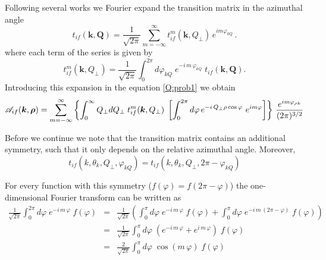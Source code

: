 Following several works \autocite{Rodrigu1996JPBp275,Galassi2002JPBp1727} we Fourier expand the transition matrix in the azimuthal angle
\[
t_{if}(\bm{k},\bm{Q}) = \frac{1}{\sqrt{2 \pi}} \sum_{m=-\infty}^{\infty} t^{m}_{if}(\bm{k},Q_{\perp}) \, e^{i m \varphi_{k Q}} \, .
\]
where each term of the series is given by
\[
t^{m}_{if}(\bm{k},Q_{\perp}) = \frac{1}{\sqrt{2 \pi}} \int_{0}^{2 \pi}
d \varphi_{k Q}\; e^{- i \,m\, \varphi_{k Q} } \;
t_{if}(\bm{k},\bm{Q}) .
\]
Introducing this expansion in the equation \ref{Q:prob1} we obtain
\[
\mathcal{A}_{if}(\bm{k},\boldsymbol{\rho}) = \sum_{m=-\infty}^{\infty} \left\{
\int_{0}^{\infty} Q_{\perp} d Q_{\perp} \;
t^{m}_{if}(\bm{k},Q_{\perp}) \; \left[ \int_{0}^{2 \pi} d \varphi \,
e^{- i \, Q_{\perp} \rho \cos{\varphi}}\ e^{i m \varphi}
\right] \right\}\, \frac{e^{i m \varphi_{\rho k}}}{(2 \pi)^{3/2}}
\]

Before we continue we note that the transition matrix contains an
additional symmetry, such that it only depends on the relative
azimuthal angle. Moreover,
\[
t_{if}(k,\theta_{k},Q_{\perp},\varphi_{k Q}) =
t_{if}(k,\theta_{k},Q_{\perp},2 \pi - \varphi_{k Q})
\]

For every function with this symmetry ($f(\varphi)=f(2 \pi - \varphi)$)
the one-dimensional Fourier transform can be written as
\begin{eqnarray} \label{Q:cFT-tm}
\frac{1}{\sqrt{2 \pi}} \int_{0}^{2 \pi} d \varphi \; e^{- i
\,m \, \varphi } \; f(\varphi) &=& \frac{1}{\sqrt{2 \pi}} \left(
\int_{0}^{\pi} d \varphi \; e^{- i \,m \, \varphi} \;
f(\varphi) + \int_{0}^{\pi} d \varphi \; e^{- i \,m \, (2 \pi
- \varphi) } \;
f(\varphi) \right) \nonumber \\
&=& \frac{1}{\sqrt{2 \pi}} \int_{0}^{\pi} d \varphi \; \left(
e^{- i \,m \, \varphi} + e^{i \,m \, \varphi} \right) \;
f(\varphi)   \nonumber \\
&=& \frac{2}{\sqrt{2 \pi}} \int_{0}^{\pi} d \varphi \; \cos{(m \,
\varphi) } \; f(\varphi)
\end{eqnarray}

